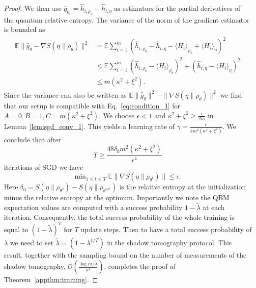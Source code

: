 \documentclass[
    reprint,
    aps,
    prx,
    longbibliography
]{revtex4-2}
\begin{document}
\begin{proof}
We then use $\hat{g}_{\theta_i} = \hat{h}_{i, \rho_\theta} - \hat{h}_{i, \eta}$ as estimators for the partial derivatives of the quantum relative entropy. The variance of the norm of the gradient estimator is bounded as
\begin{align}
\begin{split}
\label{eq:grad_bounded_variance}
    \mathbb{E} \|\hat{g}_\theta - \nabla S(\eta \|\rho_\theta) \|^2 &=
    \mathbb{E} \sum_{i=1}^m (\hat{h}_{i, \rho_\theta} - \hat{h}_{i, \eta} - \langle H_i \rangle_{\rho_\theta} + \langle H_i\rangle_\eta )^2 \\
    &\leq \mathbb{E}\sum_{i=1}^m (\hat{h}_{i, \rho_\theta} - \langle H_i \rangle_{\rho_\theta} )^2 + (\hat{h}_{i, \eta} - \langle H_i\rangle_\eta )^2 \\
    &\leq m ( \kappa^2 + \xi^2).
\end{split}
\end{align} 
Since the variance can also be written as $\mathbb{E} \|\hat{g}_\theta \|^2 - \| \nabla S(\eta \|\rho_\theta) \|^2$ we find that our setup is compatible with Eq.~\eqref{eq:condition_1} for $A=0, B=1, C=m ( \kappa^2 + \xi^2)$. We choose $\epsilon<1$ and $\kappa^2 + \xi^2 \geq \frac{\epsilon}{2m}$ in Lemma~\ref{lem:sgd_conv_1}. This yields a learning rate of $\gamma = \frac{\epsilon}{ 4 m^2 (\kappa^2 + \xi^2)}$. We conclude that after 
\begin{equation}
    T \geq \frac{48 \delta_0 m^2 ( \kappa^2 + \xi^2)}{\epsilon^4}
\end{equation}
iterations of SGD we have
\begin{equation}
    \mathrm{min}_{1\leq t \leq T} \; \mathbb{E}\|\nabla S(\eta \|\rho_{\theta^t}) \| \leq \epsilon. 
\end{equation} 
Here $\delta_0 = S(\eta\|\rho_{\theta^0})-S(\eta\|\rho_{\theta^\mathrm{opt}})$ is the relative entropy at the initialization minus the relative entropy at the optimum. Importantly we note the QBM expectation values are computed with a success probability $1-\tilde{\lambda}$ at each iteration. Consequently, the total success probability of the whole training is equal to $(1-\tilde{\lambda})^T$ for $T$ update steps. Then to have a total success probability of $\lambda$ we need to set $\tilde{\lambda}=(1-\lambda^{1/T})$ in the shadow tomography protocol. This result, together with the sampling bound on the number of measurements of the shadow tomography, $\mathcal{O}(\frac{\log{m/\tilde{\lambda}}}{\kappa^4})$, completes the proof of Theorem~\ref{appthm:training}.
\end{proof}
\end{document}
